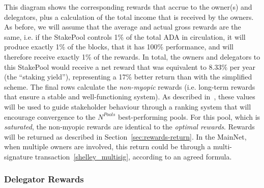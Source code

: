 \documentclass[11pt,a4paper,dvipsnames,twosided,final]{article}
\newcommand{\khcomment}[1]{\todo[color=blue!20]{KH: #1}}
\newcommand{\ada}{ADA{}}
\begin{document}
\noindent
This diagram shows the corresponding rewards that accrue to the owner(s) and delegators,
plus a calculation of the total income that is received by the owners.  As before, we will assume that the average
and actual gross rewards are the same, i.e. if the StakePool controls 1\% of the total \ada{} in
circulation, it will produce exactly 1\% of the blocks, that it has 100\% performance, and will therefore receive exactly 1\% of the rewards.
In total, the
owners and delegators to this StakePool would receive a net reward that was equivalent to 8.33\% per year
(the ``staking yield''), representing a 17\% better return than with the simplified scheme.
The final rows calculate the \emph{non-myopic} rewards (i.e. long-term rewards that ensure
a stable and well-functioning system).  As described in~\cite{delegation_design}, these values will be used to guide stakeholder behaviour
through a ranking system that will encourage convergence to the $N^{\textit{Pools}}$ best-performing pools.
For this pool, which is \emph{saturated}, the non-myopic rewards are identical to the \emph{optimal rewards}.
\khcomment{Is this always the case?}
Rewards will be returned as described in Section~\ref{sec:rewards-return}.  In the MainNet, when multiple
owners are involved, this return could be through a multi-signature transaction~\ref{shelley_multisig}, according to an agreed
formula.

\subsubsection*{Delegator Rewards}
\end{document}
